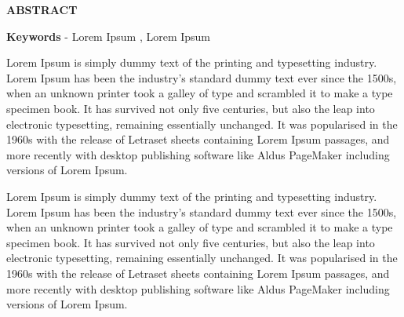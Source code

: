 \documentclass[12pt,a4paper]{report}
\begin{document}
\begin{CJK*}{UTF8}{bkai}
    \begin{center}
        \textbf{ABSTRACT}
    \end{center}

    \textbf{Keywords} - Lorem Ipsum , Lorem Ipsum

    \vspace{0.8cm}

    Lorem Ipsum is simply dummy text of the printing and typesetting industry. Lorem Ipsum has been the industry's standard dummy text ever since the 1500s, when an unknown printer took a galley of type and scrambled it to make a type specimen book. It has survived not only five centuries, but also the leap into electronic typesetting, remaining essentially unchanged. It was popularised in the 1960s with the release of Letraset sheets containing Lorem Ipsum passages, and more recently with desktop publishing software like Aldus PageMaker including versions of Lorem Ipsum.

    Lorem Ipsum is simply dummy text of the printing and typesetting industry. Lorem Ipsum has been the industry's standard dummy text ever since the 1500s, when an unknown printer took a galley of type and scrambled it to make a type specimen book. It has survived not only five centuries, but also the leap into electronic typesetting, remaining essentially unchanged. It was popularised in the 1960s with the release of Letraset sheets containing Lorem Ipsum passages, and more recently with desktop publishing software like Aldus PageMaker including versions of Lorem Ipsum.

    \newpage
    \tableofcontents %
    \newpage








\end{CJK*}
\end{document}

